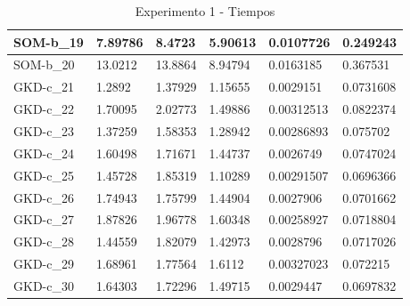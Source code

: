 \documentclass[11pt,a4paper]{article}
\begin{document}
\begin{table}[H]
\begin{tabular}{l|l|l|l|l|l|}
			\multicolumn{1}{|l|}{SOM-b\_19} & 7.89786 & 8.4723 & 5.90613 & 0.0107726 & 0.249243 \\ \hline
			\multicolumn{1}{|l|}{SOM-b\_20} & 13.0212 & 13.8864 & 8.94794 & 0.0163185 & 0.367531 \\ \hline
			\multicolumn{1}{|l|}{GKD-c\_21} & 1.2892 & 1.37929 & 1.15655 & 0.0029151 & 0.0731608 \\ \hline
			\multicolumn{1}{|l|}{GKD-c\_22} & 1.70095 & 2.02773 & 1.49886 & 0.00312513 & 0.0822374 \\ \hline
			\multicolumn{1}{|l|}{GKD-c\_23} & 1.37259 & 1.58353 & 1.28942 & 0.00286893 & 0.075702 \\ \hline
			\multicolumn{1}{|l|}{GKD-c\_24} & 1.60498 & 1.71671 & 1.44737 & 0.0026749 & 0.0747024 \\ \hline
			\multicolumn{1}{|l|}{GKD-c\_25} & 1.45728 & 1.85319 & 1.10289 & 0.00291507 & 0.0696366 \\ \hline
			\multicolumn{1}{|l|}{GKD-c\_26} & 1.74943 & 1.75799 & 1.44904 & 0.0027906 & 0.0701662 \\ \hline
			\multicolumn{1}{|l|}{GKD-c\_27} & 1.87826 & 1.96778 & 1.60348 & 0.00258927 & 0.0718804 \\ \hline
			\multicolumn{1}{|l|}{GKD-c\_28} & 1.44559 & 1.82079 & 1.42973 & 0.0028796 & 0.0717026 \\ \hline
			\multicolumn{1}{|l|}{GKD-c\_29} & 1.68961 & 1.77564 & 1.6112 & 0.00327023 & 0.072215 \\ \hline
			\multicolumn{1}{|l|}{GKD-c\_30} & 1.64303 & 1.72296 & 1.49715 & 0.0029447 & 0.0697832 \\ \hline
		\end{tabular}
		\caption{ Experimento 1 - Tiempos }
		\label{312}
	\end{table}
\end{document}
